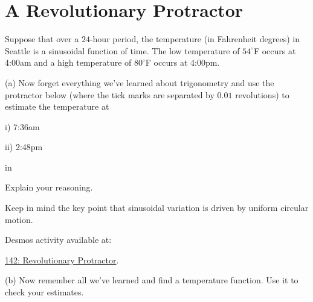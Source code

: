 \documentclass{ximera}
\newcommand{\pskip}{\vskip 0.1 in}
\begin{document}
\section{A Revolutionary Protractor}
\begin{question}   \label{Qerg5454242}
Suppose that over a $24$-hour period, the temperature (in Fahrenheit degrees) in Seattle is a sinusoidal function of time. The low temperature of $54^\circ$F occurs at 4:00am and a high temperature of $80^\circ$F occurs at 4:00pm.

(a) Now forget everything we've learned about trigonometry and use the protractor below (where the tick marks are separated by $0.01$ revolutions) to estimate the temperature at

i) 7:36am

ii) 2:48pm


\pskip

Explain your reasoning. 

Keep in mind the key point that sinusoidal variation is driven by uniform circular motion. 

Desmos activity available at:

\href{https://www.desmos.com/calculator/2gkg7j5eze}{142: Revolutionary Protractor}.

 
\begin{onlineOnly}
    \begin{center}
\end{center}
\end{onlineOnly}



(b) Now remember all we've learned and find a temperature function. Use it to check your estimates. 

\end{question}
\end{document}
